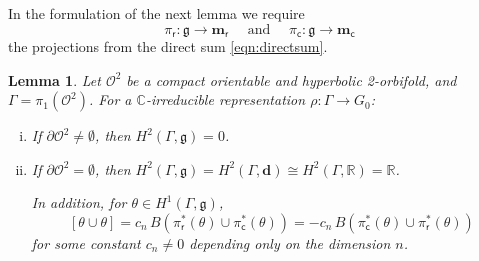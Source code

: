 \documentclass[a4paper,11pt]{article}
\newtheorem{Lemma}[Theorem]{Lemma}
\begin{document}


In the formulation of the next lemma we require
\begin{equation}
\label{eqn:proj}
\pi_{\mathsf r}:\mathfrak{g}\to\mathbf m_{\mathsf r}
\quad\textrm{ and } \quad
\pi_{\mathsf c}:\mathfrak{g}\to\mathbf m_{\mathsf c}
\end{equation}
the projections from the direct sum \eqref{eqn:directsum}.
 

\begin{Lemma}
 \label{Lemma:cupprodcut}
 Let $\mathcal O^2$ be a compact orientable and hyperbolic 2-orbifold, and $\Gamma=\pi_1(\mathcal O^2)$.
 For a $\mathbb C$-irreducible representation
$\rho\colon \Gamma\to G_0$:
\begin{enumerate}[(i)]
 \item   If $\partial  \mathcal O^2\neq \emptyset$, then $H^2(\Gamma, \mathfrak g)=0$.
 
 \item  If $\partial  \mathcal O^2= \emptyset$, then 
 $H^2(\Gamma, \mathfrak g)= H^2(\Gamma, \mathbf d)\cong H^2(\Gamma, \mathbb R)=\mathbb R$. 
 
 In addition, for $\theta\in H^1(\Gamma, \mathfrak g)$,
 $$
 [\theta\cup\theta]= 
 c_n \, B( \pi_{\mathsf r}^*(\theta)\cup \pi_{\mathsf c}^* (\theta) )
 = - c_n \, B( \pi_{\mathsf c}^*(\theta)\cup \pi_{\mathsf r}^* (\theta) )
 $$
 for some constant $c_n\neq 0$ depending only on the dimension $n$.
\end{enumerate}
\end{Lemma}
\end{document}
